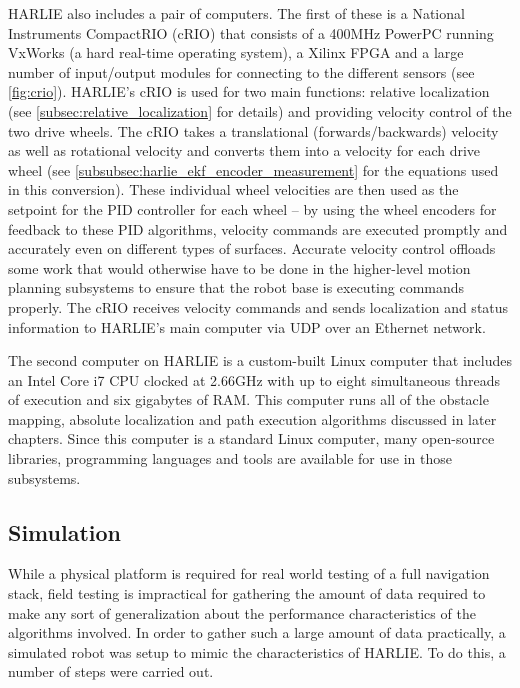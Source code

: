 HARLIE also includes a pair of computers. The first of these is a National Instruments CompactRIO (cRIO) that consists of a 400MHz PowerPC running VxWorks (a hard real-time operating system), a Xilinx FPGA and a large number of input/output modules for connecting to the different sensors \autocite{NIcRIO9074} (see \autoref{fig:crio}). HARLIE's cRIO is used for two main functions: relative localization (see \autoref{subsec:relative_localization} for details) and providing velocity control of the two drive wheels. The cRIO takes a translational (forwards/backwards) velocity as well as rotational velocity and converts them into a velocity for each drive wheel (see \autoref{subsubsec:harlie_ekf_encoder_measurement} for the equations used in this conversion). These individual wheel velocities are then used as the setpoint for the PID controller \autocite{PIDControllerWiki} for each wheel -- by using the wheel encoders for feedback to these PID algorithms, velocity commands are executed promptly and accurately even on different types of surfaces. Accurate velocity control offloads some work that would otherwise have to be done in the higher-level motion planning subsystems to ensure that the robot base is executing commands properly. The cRIO receives velocity commands and sends localization and status information to HARLIE's main computer via UDP over an Ethernet network.

The second computer on HARLIE is a custom-built Linux computer that includes an Intel Core i7 CPU clocked at 2.66GHz with up to eight simultaneous threads of execution and six gigabytes of RAM. This computer runs all of the obstacle mapping, absolute localization and path execution algorithms discussed in later chapters. Since this computer is a standard Linux computer, many open-source libraries, programming languages and tools are available for use in those subsystems.

\subsection{Simulation}\label{subsec:simulation_setup}

While a physical platform is required for real world testing of a full navigation stack, field testing is impractical for gathering the amount of data required to make any sort of generalization about the performance characteristics of the algorithms involved. In order to gather such a large amount of data practically, a simulated robot was setup to mimic the characteristics of HARLIE. To do this, a number of steps were carried out.

